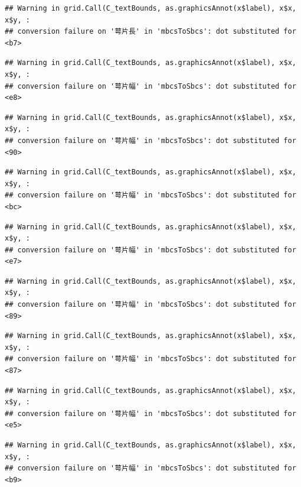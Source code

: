 \documentclass[
]{book}
\begin{document}
\begin{verbatim}
## Warning in grid.Call(C_textBounds, as.graphicsAnnot(x$label), x$x, x$y, :
## conversion failure on '萼片長' in 'mbcsToSbcs': dot substituted for <b7>
\end{verbatim}

\begin{verbatim}
## Warning in grid.Call(C_textBounds, as.graphicsAnnot(x$label), x$x, x$y, :
## conversion failure on '萼片幅' in 'mbcsToSbcs': dot substituted for <e8>
\end{verbatim}

\begin{verbatim}
## Warning in grid.Call(C_textBounds, as.graphicsAnnot(x$label), x$x, x$y, :
## conversion failure on '萼片幅' in 'mbcsToSbcs': dot substituted for <90>
\end{verbatim}

\begin{verbatim}
## Warning in grid.Call(C_textBounds, as.graphicsAnnot(x$label), x$x, x$y, :
## conversion failure on '萼片幅' in 'mbcsToSbcs': dot substituted for <bc>
\end{verbatim}

\begin{verbatim}
## Warning in grid.Call(C_textBounds, as.graphicsAnnot(x$label), x$x, x$y, :
## conversion failure on '萼片幅' in 'mbcsToSbcs': dot substituted for <e7>
\end{verbatim}

\begin{verbatim}
## Warning in grid.Call(C_textBounds, as.graphicsAnnot(x$label), x$x, x$y, :
## conversion failure on '萼片幅' in 'mbcsToSbcs': dot substituted for <89>
\end{verbatim}

\begin{verbatim}
## Warning in grid.Call(C_textBounds, as.graphicsAnnot(x$label), x$x, x$y, :
## conversion failure on '萼片幅' in 'mbcsToSbcs': dot substituted for <87>
\end{verbatim}

\begin{verbatim}
## Warning in grid.Call(C_textBounds, as.graphicsAnnot(x$label), x$x, x$y, :
## conversion failure on '萼片幅' in 'mbcsToSbcs': dot substituted for <e5>
\end{verbatim}

\begin{verbatim}
## Warning in grid.Call(C_textBounds, as.graphicsAnnot(x$label), x$x, x$y, :
## conversion failure on '萼片幅' in 'mbcsToSbcs': dot substituted for <b9>
\end{verbatim}
\end{document}
